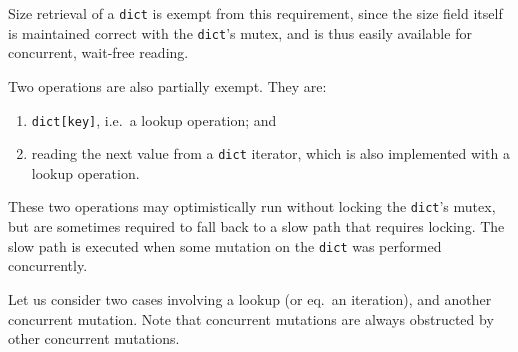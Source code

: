 Size retrieval of a \texttt{dict} is exempt from this requirement, since the size field itself is maintained correct with the \texttt{dict}'s mutex, and is thus easily available for concurrent, wait-free reading.

Two operations are also partially exempt.
They are:
\begin{enumerate}
	\item \texttt{{dict[key]}}, i.e.\ a lookup operation; and
	\item reading the next value from a \texttt{dict} iterator, which is also implemented with a lookup operation.
\end{enumerate}
These two operations may optimistically run without locking the \texttt{dict}'s mutex, but are sometimes required to fall back to a slow path that requires locking.
The slow path is executed when some mutation on the \texttt{dict} was performed concurrently.

Let us consider two cases involving a lookup (or eq.\ an iteration), and another concurrent mutation.
Note that concurrent mutations are always obstructed by other concurrent mutations.

